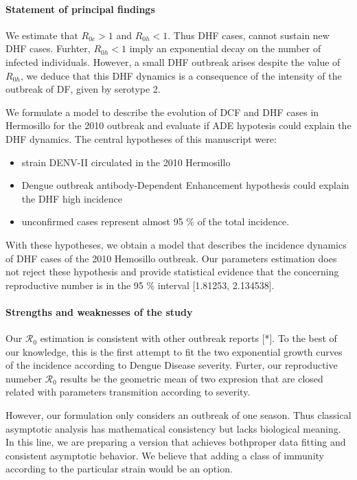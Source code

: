 \paragraph{Statement of principal findings}
    We estimate that $R_{0c}>1$ and  $R_{0h}<1$. Thus DHF cases, 
cannot sustain new DHF cases. Furhter, $R_{0h}<1$ imply an
exponential decay on the number of infected individuals. However,
a small DHF outbreak arises despite the value of $R_{0h}$, we deduce
that this DHF dynamics is a consequence of the
intensity of the outbreak of DF, given by serotype 2.

    We formulate a  model to describe the evolution of DCF and DHF
cases in Hermosillo for the 2010 outbreak and evaluate if ADE
hypotesis could explain the DHF dynamics. 
The central hypotheses of this manuscript were:
    \begin{itemize}
        \item
            strain DENV-II circulated in the 2010 Hermosillo 
        \item
            Dengue outbreak antibody-Dependent Enhancement hypothesis
            could explain the DHF high incidence 
        \item
            unconfirmed cases represent almost 95 \% of the total
            incidence.
    \end{itemize}
    With these hypotheses, we obtain a model that describes
the incidence dynamics of DHF cases of the 2010 Hemosillo outbreak.
Our parameters estimation does not reject these hypothesis and provide
statistical evidence that the concerning reproductive number is in the 
\num{95} \% interval [\num{1.81253}, \num{2.134538}].

%
\paragraph{Strengths and weaknesses of the study} 
    Our $\mathcal{R}_0$ estimation is consistent with other outbreak reports [*].
To the best of our knowledge, this is the first attempt to fit the 
two exponential growth curves of the incidence according to Dengue 
Disease severity.  Furter, our reproductive numeber $\mathcal{R}_0$ 
results be the geometric mean of two expresion that are closed related 
with parameters transmition according to severity.  

    However, our formulation only considers an outbreak
of one season. Thus classical asymptotic analysis has mathematical 
consistency but lacks biological meaning.  In this line, we are preparing
a version that achieves both\textemdash proper data fitting and consistent
asymptotic behavior. We believe that adding a class of immunity according
to the particular strain would be an option.


